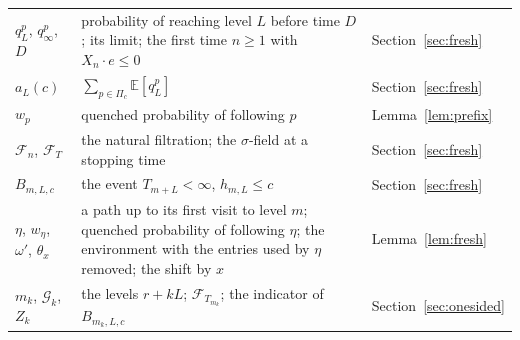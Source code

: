 \documentclass[11pt]{amsart}
\theoremstyle{remark}
\newcommand{\E}{\mathbb{E}}
\begin{document}
\begin{center}
\begin{tabular}{@{}lp{}l@{}}
$q_L^p$, $q_\infty^p$, $D$ & probability of reaching level $L$ before time $D$; its limit; the first time $n\ge1$ with $X_n\cdot e\le0$ & Section~\ref{sec:fresh}\\
$a_L(c)$ & $\sum_{p\in\Pi_c}\E[q_L^p]$ & Section~\ref{sec:fresh}\\
$w_p$ & quenched probability of following $p$ & Lemma~\ref{lem:prefix}\\
$\mathcal F_n$, $\mathcal F_T$ & the natural filtration; the $\sigma$-field at a stopping time & Section~\ref{sec:fresh}\\
$B_{m,L,c}$ & the event $T_{m+L}<\infty$, $h_{m,L}\le c$ & Section~\ref{sec:fresh}\\
$\eta$, $w_\eta$, $\omega'$, $\theta_x$ & a path up to its first visit to level $m$; quenched probability of following $\eta$; the environment with the entries used by $\eta$ removed; the shift by $x$ & Lemma~\ref{lem:fresh}\\
$m_k$, $\mathcal G_k$, $Z_k$ & the levels $r+kL$; $\mathcal F_{T_{m_k}}$; the indicator of $B_{m_k,L,c}$ & Section~\ref{sec:onesided}\\
\bottomrule
\end{tabular}
\end{center}
\end{document}
